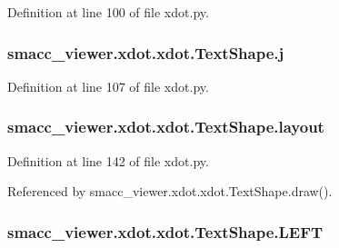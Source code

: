 Definition at line 100 of file xdot.\+py.

\subsubsection[{\texorpdfstring{j}{j}}]{\setlength{\rightskip}{0pt plus 5cm}smacc\+\_\+viewer.\+xdot.\+xdot.\+Text\+Shape.\+j}\hypertarget{classsmacc__viewer_1_1xdot_1_1xdot_1_1TextShape_ad30fd393e29daaba5d821ebf218e87b4}{}\label{classsmacc__viewer_1_1xdot_1_1xdot_1_1TextShape_ad30fd393e29daaba5d821ebf218e87b4}


Definition at line 107 of file xdot.\+py.

\subsubsection[{\texorpdfstring{layout}{layout}}]{\setlength{\rightskip}{0pt plus 5cm}smacc\+\_\+viewer.\+xdot.\+xdot.\+Text\+Shape.\+layout}\hypertarget{classsmacc__viewer_1_1xdot_1_1xdot_1_1TextShape_a103766aba4c4460fabf61921f113bb4d}{}\label{classsmacc__viewer_1_1xdot_1_1xdot_1_1TextShape_a103766aba4c4460fabf61921f113bb4d}


Definition at line 142 of file xdot.\+py.



Referenced by smacc\+\_\+viewer.\+xdot.\+xdot.\+Text\+Shape.\+draw().

\subsubsection[{\texorpdfstring{L\+E\+FT}{LEFT}}]{\setlength{\rightskip}{0pt plus 5cm}smacc\+\_\+viewer.\+xdot.\+xdot.\+Text\+Shape.\+L\+E\+FT\hspace{0.3cm}{\ttfamily [static]}}\hypertarget{classsmacc__viewer_1_1xdot_1_1xdot_1_1TextShape_abceabee26d04b41a914d980246ca0269}{}\label{classsmacc__viewer_1_1xdot_1_1xdot_1_1TextShape_abceabee26d04b41a914d980246ca0269}


